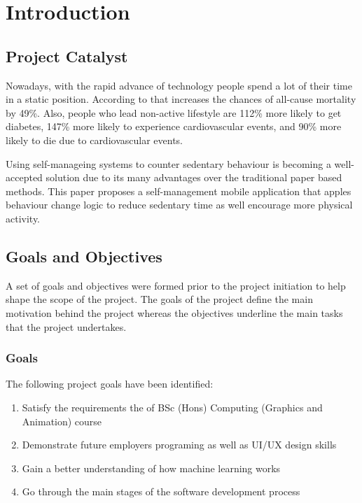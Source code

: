 \chapter{Introduction}
\label{Chapter:Introduction}

    \section{Project Catalyst}
    Nowadays, with the rapid advance of technology people spend a lot of their time in a static position. According to \citet{wilmot2012} that increases the chances of all-cause mortality by 49\%.  Also, people who lead non-active lifestyle are 112\% more likely to get diabetes, 147\% more likely to experience cardiovascular events, and 90\% more likely to die due to cardiovascular events. 
    
    Using self-manageing systems to counter sedentary behaviour is becoming a well-accepted solution due to its many advantages over the traditional paper based methods. This paper proposes a self-management mobile application that apples behaviour change logic to reduce sedentary time as well encourage more physical activity. 
    
    
    
    \section{Goals and Objectives}
    A set of goals and objectives were formed prior to the project initiation to help shape the scope of the project. The goals of the project define the main motivation behind the project whereas the objectives underline the main tasks that the project undertakes.
    
    \subsection*{Goals}
    The following project goals have been identified: 
    \begin{enumerate}
        \item Satisfy the requirements the of BSc (Hons) Computing (Graphics and Animation) course
        \item Demonstrate future employers programing as well as UI/UX design skills
        \item Gain a better understanding of how machine learning works 
        \item Go through the main stages of the software development process
    \end{enumerate}
    
